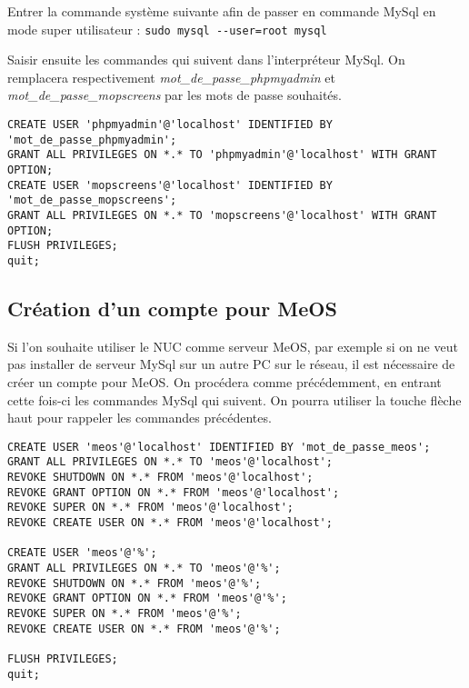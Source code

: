 \documentclass[a4paper]{ffco-rapport}
\begin{document}
		Entrer la commande système suivante afin de passer en commande MySql en mode \og{}super utilisateur\fg{} : \verb|sudo mysql --user=root mysql|
		
		Saisir ensuite les commandes qui suivent dans l'interpréteur MySql.
		On remplacera respectivement \newline\emph{mot\_de\_passe\_phpmyadmin} et \emph{mot\_de\_passe\_mopscreens} par les mots de passe souhaités.

\makeatletter
\global\let\tikz@ensure@dollar@catcode=\relax
\makeatother
	
			\begin{verbatim}
CREATE USER 'phpmyadmin'@'localhost' IDENTIFIED BY 'mot_de_passe_phpmyadmin';
GRANT ALL PRIVILEGES ON *.* TO 'phpmyadmin'@'localhost' WITH GRANT OPTION;
CREATE USER 'mopscreens'@'localhost' IDENTIFIED BY 'mot_de_passe_mopscreens';
GRANT ALL PRIVILEGES ON *.* TO 'mopscreens'@'localhost' WITH GRANT OPTION;
FLUSH PRIVILEGES;
quit;
			\end{verbatim}

	\subsection{Création d'un compte pour MeOS}
	
		Si l'on souhaite utiliser le NUC comme serveur MeOS, par exemple si on ne veut pas installer de serveur MySql sur un autre PC sur le réseau, il est nécessaire de créer un compte pour MeOS.
		On procédera comme précédemment, en entrant cette fois-ci les commandes MySql qui suivent.
		On pourra utiliser la touche \og{}flèche haut\fg{} pour rappeler les commandes précédentes.
	
			\begin{verbatim}
CREATE USER 'meos'@'localhost' IDENTIFIED BY 'mot_de_passe_meos';
GRANT ALL PRIVILEGES ON *.* TO 'meos'@'localhost';
REVOKE SHUTDOWN ON *.* FROM 'meos'@'localhost';
REVOKE GRANT OPTION ON *.* FROM 'meos'@'localhost';
REVOKE SUPER ON *.* FROM 'meos'@'localhost';
REVOKE CREATE USER ON *.* FROM 'meos'@'localhost';

CREATE USER 'meos'@'%';
GRANT ALL PRIVILEGES ON *.* TO 'meos'@'%';
REVOKE SHUTDOWN ON *.* FROM 'meos'@'%';
REVOKE GRANT OPTION ON *.* FROM 'meos'@'%';
REVOKE SUPER ON *.* FROM 'meos'@'%';
REVOKE CREATE USER ON *.* FROM 'meos'@'%';

FLUSH PRIVILEGES;
quit;
			\end{verbatim}
	
\end{document}
